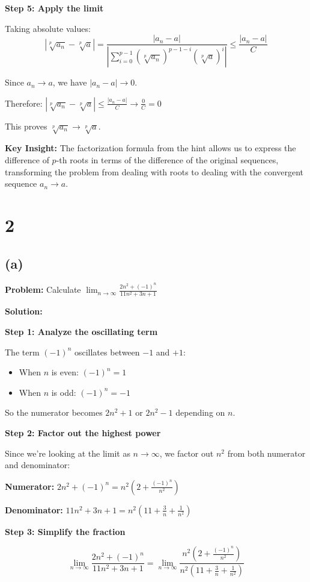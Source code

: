 \documentclass[12pt,a4paper]{article}
\theoremstyle{definition}
\theoremstyle{remark}
\begin{document}
\textbf{Step 5: Apply the limit}

Taking absolute values:
$$|\sqrt[p]{a_n} - \sqrt[p]{a}| = \frac{|a_n - a|}{\left|\sum_{i=0}^{p-1} (\sqrt[p]{a_n})^{p-1-i}(\sqrt[p]{a})^i\right|} \leq \frac{|a_n - a|}{C}$$

Since $a_n \to a$, we have $|a_n - a| \to 0$.

Therefore: $|\sqrt[p]{a_n} - \sqrt[p]{a}| \leq \frac{|a_n - a|}{C} \to \frac{0}{C} = 0$

This proves $\sqrt[p]{a_n} \to \sqrt[p]{a}$.

\textbf{Key Insight:} The factorization formula from the hint allows us to express the difference of $p$-th roots in terms of the difference of the original sequences, transforming the problem from dealing with roots to dealing with the convergent sequence $a_n \to a$.

\section*{2}
\subsection*{(a)}
\textbf{Problem:} Calculate $\lim_{n \to \infty} \frac{2n^2 + (-1)^n}{11n^2 + 3n + 1}$

\textbf{Solution:}

\textbf{Step 1: Analyze the oscillating term}

The term $(-1)^n$ oscillates between $-1$ and $+1$:
\begin{itemize}
\item When $n$ is even: $(-1)^n = 1$
\item When $n$ is odd: $(-1)^n = -1$
\end{itemize}

So the numerator becomes $2n^2 + 1$ or $2n^2 - 1$ depending on $n$.

\textbf{Step 2: Factor out the highest power}

Since we're looking at the limit as $n \to \infty$, we factor out $n^2$ from both numerator and denominator:

\textbf{Numerator:} $2n^2 + (-1)^n = n^2\left(2 + \frac{(-1)^n}{n^2}\right)$

\textbf{Denominator:} $11n^2 + 3n + 1 = n^2\left(11 + \frac{3}{n} + \frac{1}{n^2}\right)$

\textbf{Step 3: Simplify the fraction}

$$\lim_{n \to \infty} \frac{2n^2 + (-1)^n}{11n^2 + 3n + 1} = \lim_{n \to \infty} \frac{n^2\left(2 + \frac{(-1)^n}{n^2}\right)}{n^2\left(11 + \frac{3}{n} + \frac{1}{n^2}\right)}$$
\end{document}
